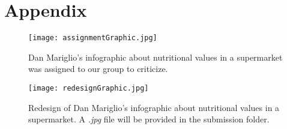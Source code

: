 \clearpage
\section{Appendix}

\begin{figure}[h]
  \centering
	\texttt{[image: assignmentGraphic.jpg]}
  \caption{Dan Mariglio's infographic about nutritional values in a supermarket
	was assigned to our group to criticize.}
	\label{assignmentGraphic}
\end{figure}

\begin{figure}[h]
  \centering
	\texttt{[image: redesignGraphic.jpg]}
	\caption{Redesign of Dan Mariglio's infographic about nutritional values in a
	supermarket. A \textit{.jpg} file will be provided in the submission folder.}
	\label{redesignGraphic}
\end{figure}
